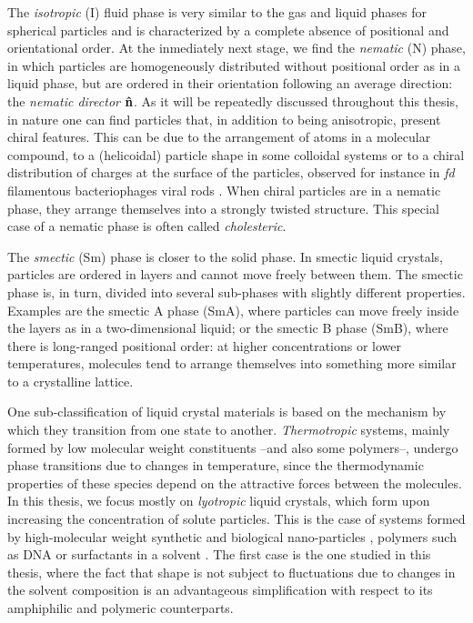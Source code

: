 The {\em isotropic} (I) fluid phase is very similar to the gas and liquid phases for spherical particles and is characterized by a complete absence of positional and orientational order. At the inmediately next stage, we find the {\em nematic} (N) phase, in which particles are homogeneously distributed without positional order as in a liquid phase, but are ordered in their orientation following an average direction: the {\em nematic director} ${\bf \hat{n}}$. As it will be repeatedly discussed throughout this thesis, in nature one can find particles that, in addition to being anisotropic, present chiral features. This can be due to the arrangement of atoms in a molecular compound, to a (helicoidal) particle shape in some colloidal systems or to a chiral distribution of charges at the surface of the particles, observed for instance in {\em fd} filamentous bacteriophages viral rods \cite{Gibaud_2017}. When chiral particles are in a nematic phase, they arrange themselves into a strongly twisted structure. This special case of a nematic phase is often called {\em cholesteric}.

The {\em smectic} (Sm) phase is closer to the solid phase. In smectic liquid crystals, particles are ordered in layers and cannot move freely between them. The smectic phase is, in turn, divided into several sub-phases with slightly different properties. Examples are the smectic A phase (SmA), where particles can move freely inside the layers as in a two-dimensional liquid; or the smectic B phase (SmB), where there is long-ranged positional order: at higher concentrations or lower temperatures, molecules tend to arrange themselves into something more similar to a crystalline lattice.

One sub-classification of liquid crystal materials is based on the mechanism by which they transition from one state to another. {\em Thermotropic} systems, mainly formed by low molecular weight constituents --and also some polymers--, undergo phase transitions due to changes in temperature, since the thermodynamic properties of these species depend on the attractive forces between the molecules. In this thesis, we focus mostly on  {\em lyotropic} liquid crystals, which form upon increasing the concentration of solute particles. This is the case of systems formed by high-molecular weight synthetic and biological nano-particles \cite{sonin1998inorganic,dogic-fraden_fil}, polymers such as DNA \cite{livolantDNAoverview} or surfactants in a solvent \cite{fontell1981}. The first case is the one studied in this thesis, where the fact that shape is not subject to fluctuations due to changes in the solvent composition is an advantageous simplification with respect to its amphiphilic and polymeric counterparts.

